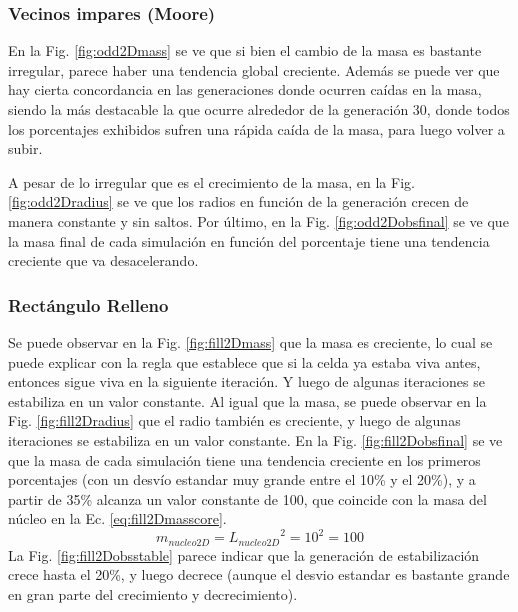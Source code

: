 \subsubsection{Vecinos impares (Moore)}
En la Fig. \ref{fig:odd2Dmass} se ve que si bien el cambio de la masa es bastante irregular, parece haber una tendencia global creciente.
Además se puede ver que hay cierta concordancia en las generaciones donde ocurren caídas en la masa, siendo la más destacable la que ocurre alrededor de la generación 30, donde todos los porcentajes exhibidos sufren una rápida caída de la masa, para luego volver a subir.

A pesar de lo irregular que es el crecimiento de la masa, en la Fig. \ref{fig:odd2Dradius} se ve que los radios en función de la generación crecen de manera constante y sin saltos.
Por último, en la Fig. \ref{fig:odd2Dobsfinal} se ve que la masa final de cada simulación en función del porcentaje tiene una tendencia creciente que va desacelerando.

\subsubsection{Rectángulo Relleno}
Se puede observar en la Fig. \ref{fig:fill2Dmass} que la masa es creciente, lo cual se puede explicar con la regla que establece que si la celda ya estaba viva antes, entonces sigue viva en la siguiente iteración.
Y luego de algunas iteraciones se estabiliza en un valor constante.
Al igual que la masa, se puede observar en la Fig. \ref{fig:fill2Dradius} que el radio también es creciente, y luego de algunas iteraciones se estabiliza en un valor constante.
En la Fig. \ref{fig:fill2Dobsfinal} se ve que la masa de cada simulación tiene una tendencia creciente en los primeros porcentajes (con un desvío estandar muy grande entre el 10\% y el 20\%), y a partir de 35\% alcanza un valor constante de 100,
que coincide con la masa del núcleo en la Ec. \ref{eq:fill2Dmasscore}.
\begin{equation}
    \label{eq:fill2Dmasscore}
    m_{nucleo2D} = {L_{nucleo2D}}^2 = 10^2 = 100
\end{equation}
La Fig. \ref{fig:fill2Dobsstable} parece indicar que la generación de estabilización crece hasta el 20\%, y luego decrece (aunque el desvio estandar es bastante grande en gran parte del crecimiento y decrecimiento).


